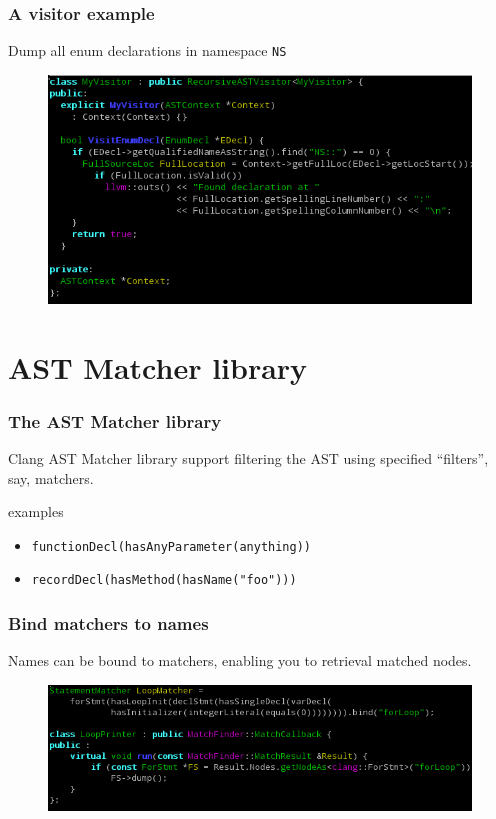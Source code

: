 \documentclass[]{beamer}
\begin{document}
\begin{frame}
  \frametitle{A visitor example}
  Dump all enum declarations in namespace \texttt{NS}
  \begin{figure}
    \centerline{\includegraphics[width=\textwidth]{figures/myvisitor}}
  \end{figure}
\end{frame}

\section{AST Matcher library}
\frame{\tableofcontents[currentsection]}
\begin{frame}
  \frametitle{The AST Matcher library}
  Clang AST Matcher library support filtering the AST using specified
  ``filters'', say, matchers.
  \pause
  \begin{block}{examples}
    \begin{itemize}
    \item \texttt{functionDecl(hasAnyParameter(anything))}
    \item \texttt{recordDecl(hasMethod(hasName("foo")))}
    \end{itemize}
  \end{block}
\end{frame}

\begin{frame}
  \frametitle{Bind matchers to names}
  Names can be bound to matchers, enabling you to retrieval matched nodes.
  \begin{figure}
    \centerline{\includegraphics[width=\textwidth]{figures/matcherbind.png}}
  \end{figure}
\end{frame}
\end{document}
